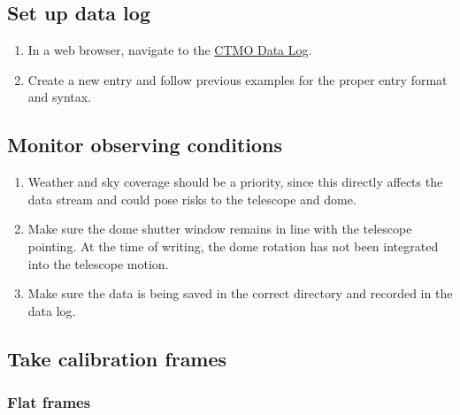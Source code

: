 \documentclass{article}
\begin{document}
	\subsection{Set up data log}
	\label{sec:set-up-data-log}
	
	\begin{enumerate}
		
		\item In a web browser, navigate to the \href{https://docs.google.com/spreadsheets/d/1-flrFYcHwpuXavXAMwkF41ibTWqWWC0Sgsv5X402HyY/edit?usp=sharing}{CTMO Data Log}.
		
		\item Create a new entry and follow previous examples for the proper entry format and syntax.
		
	\end{enumerate}
	
	\subsection{Monitor observing conditions}
	\label{sec:monitor-observing-conditions}
	
	\begin{enumerate}
		
		\item Weather and sky coverage should be a priority, since this directly affects the data stream and could pose risks to the telescope and dome.
		
		\item Make sure the dome shutter window remains in line with the telescope pointing. At the time of writing, the dome rotation has not been integrated into the telescope motion.
		
		\item Make sure the data is being saved in the correct directory and recorded in the data log.
		
	\end{enumerate}
	
	\subsection{Take calibration frames}
	\label{sec:take-calibration-frames}
	
	\subsubsection{Flat frames}
	\label{sec:flat-frames}
	
\end{document}
